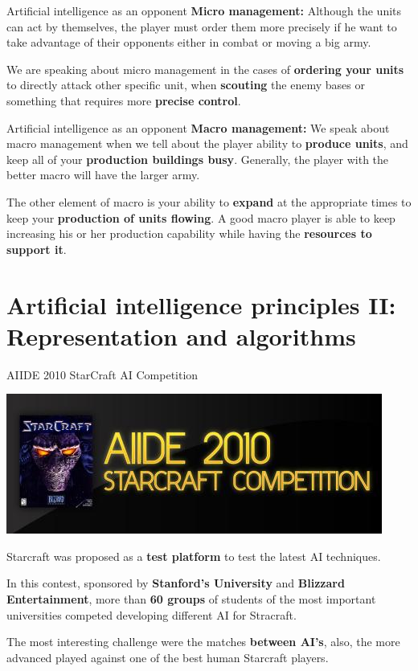 \documentclass[10pt]{beamer}
\begin{document}
\begin{frame}{Artificial intelligence as an opponent}
      \textbf{Micro management:} Although the units can act by themselves, the player must order them more precisely if he want to take advantage of their opponents either in combat or moving a big army.\newline

      We are speaking about micro management in the cases of \textbf{ordering your units} to directly attack other specific unit, when \textbf{scouting} the enemy bases or something that requires more \textbf{precise control}.
\end{frame}

\begin{frame}{Artificial intelligence as an opponent}
      \textbf{Macro management:} We speak about macro management when we tell about the player ability to \textbf{produce units}, and keep all of your \textbf{production buildings busy}. Generally, the player with the better macro will have the larger army. \newline

The other element of macro is your ability to \textbf{expand} at the appropriate times to keep your \textbf{production of units flowing}. A good macro player is able to keep increasing his or her production capability while having the \textbf{resources to support it}.
\end{frame}


\section{Artificial intelligence principles II: Representation and algorithms}

\begin{frame}{AIIDE 2010 StarCraft AI Competition}
\begin{center}
	  \includegraphics[scale=0.3]{aide.png}
\end{center}
Starcraft was proposed as a \textbf{test platform} to test the latest AI techniques. \newline

In this contest, sponsored by \textbf{Stanford's University} and \textbf{Blizzard Entertainment}, more than \textbf{60 groups} of students of the most important universities competed developing different AI for Stracraft.\newline

The most interesting challenge were the matches \textbf{between AI's}, also, the more advanced played against one of the best human Starcraft players.
\end{frame}
\end{document}
